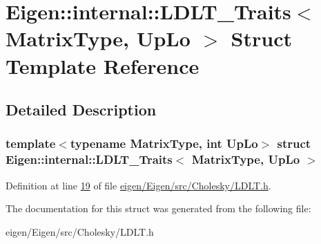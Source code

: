\hypertarget{struct_eigen_1_1internal_1_1_l_d_l_t___traits}{}\section{Eigen\+:\+:internal\+:\+:L\+D\+L\+T\+\_\+\+Traits$<$ Matrix\+Type, Up\+Lo $>$ Struct Template Reference}
\label{struct_eigen_1_1internal_1_1_l_d_l_t___traits}


\subsection{Detailed Description}
\subsubsection*{template$<$typename Matrix\+Type, int Up\+Lo$>$\newline
struct Eigen\+::internal\+::\+L\+D\+L\+T\+\_\+\+Traits$<$ Matrix\+Type, Up\+Lo $>$}



Definition at line \hyperlink{eigen_2_eigen_2src_2_cholesky_2_l_d_l_t_8h_source_l00019}{19} of file \hyperlink{eigen_2_eigen_2src_2_cholesky_2_l_d_l_t_8h_source}{eigen/\+Eigen/src/\+Cholesky/\+L\+D\+L\+T.\+h}.



The documentation for this struct was generated from the following file\+:\begin{DoxyCompactItemize}
\item 
eigen/\+Eigen/src/\+Cholesky/\+L\+D\+L\+T.\+h\end{DoxyCompactItemize}
